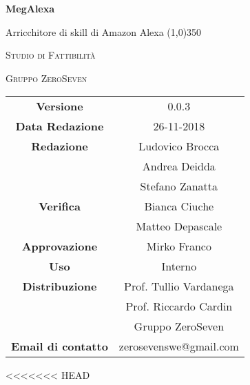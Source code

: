 \documentclass[a4paper,12pt]{book}
\author{Mirko Franco}
\date{26-11-2018}
\begin{document}
\begin{titlepage}
	\centering
	{\huge\bfseries MegAlexa\par}
	Arricchitore di skill di Amazon Alexa
	\line(1,0){350} \\
	{\scshape\LARGE Studio di Fattibilità \par}
	\vspace{1cm}
	{\scshape Gruppo ZeroSeven \par}
	\logo
	\begin{tabular}{c|c}
		{\hfill \textbf{Versione}} 			& 0.0.3				\\
		{\hfill\textbf{Data Redazione}} 	& 26-11-2018		\\ 
		{\hfill\textbf{Redazione}} 			&  		Ludovico Brocca \\ & Andrea Deidda\\ & Stefano Zanatta		\\
		{\hfill\textbf{Verifica}} 				&  					Bianca Ciuche \\ & Matteo Depascale\\ 
		{\hfill\textbf{Approvazione}} 		&  				Mirko Franco\\ 
		{\hfill\textbf{Uso}} 					& 		Interno		\\ 
		{\hfill\textbf{Distribuzione}} 			& 			Prof. Tullio Vardanega \\ & Prof. Riccardo Cardin \\ & Gruppo ZeroSeven		\\ 
		{\hfill\textbf{Email di contatto}} & zerosevenswe@gmail.com \\
	\end{tabular}
\end{titlepage}
	

	
\label{LastFrontPage}
	\newpage	
	
	\pagestyle{mymain}
	\tableofcontents
<<<<<<< HEAD
		
	
	
	
			
			
		
	
	\label{LastPage}
\end{document}
